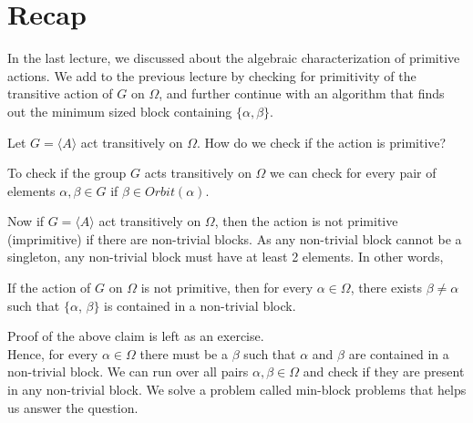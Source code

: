 



\section{Recap}
In the last lecture, we discussed about the algebraic characterization of primitive actions. We add to the previous lecture by checking for primitivity of the transitive action of $G$ on $\Omega$, and further continue with an algorithm that finds out the minimum sized block containing $\{\alpha,\beta\}$.

\begin{problem}
Let $G=\langle A \rangle$ act transitively on $\Omega$.
How do we check if the action is primitive?
\end{problem}

To check if the group $G$ acts transitively on $\Omega$ we can check for every pair of elements $\alpha,\beta\in G$ if $\beta\in Orbit(\alpha)$.


Now if $G=\langle A \rangle$ act transitively on $\Omega$, then the action is not primitive (imprimitive) if there are non-trivial blocks. As any non-trivial block cannot be a singleton, any non-trivial block must have at least 2 elements. In other words, 


\begin{claim}
If the action of $G$ on $\Omega$ is not primitive, then for every $\alpha\in\Omega$, there exists $\beta\neq\alpha$ such that $\{\alpha$, $\beta\}$ is contained in a non-trivial block.
\end{claim}
Proof of the above claim is left as an exercise.\\



Hence, for every $\alpha\in\Omega$ there must be a $\beta$ such that $\alpha$ and $\beta$ are contained in a non-trivial block. We can run over all pairs $\alpha,\beta\in\Omega$ and check if they are present in any non-trivial block. We solve a problem called min-block problems that helps us answer the question.  
%



